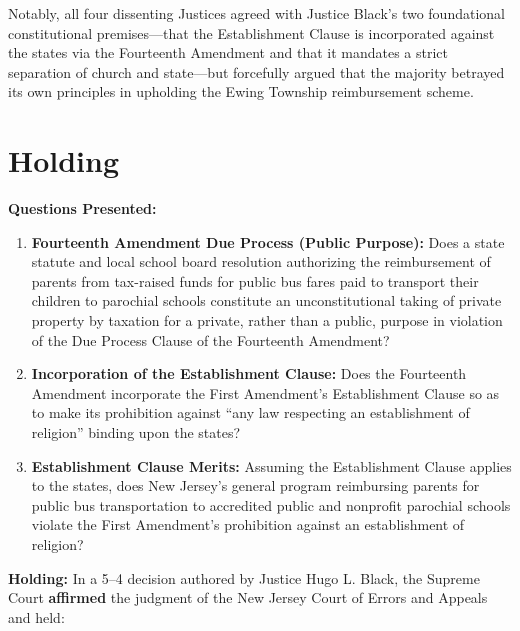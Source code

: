 \documentclass[12pt]{article}
\begin{document}
Notably, all four dissenting Justices agreed with Justice Black's two foundational constitutional premises---that the Establishment Clause is incorporated against the states via the Fourteenth Amendment and that it mandates a strict separation of church and state---but forcefully argued that the majority betrayed its own principles in upholding the Ewing Township reimbursement scheme.

\section{Holding}
\textbf{Questions Presented:}

\begin{enumerate}
  \item \textbf{Fourteenth Amendment Due Process (Public Purpose):} Does a state statute and local school board resolution authorizing the reimbursement of parents from tax-raised funds for public bus fares paid to transport their children to parochial schools constitute an unconstitutional taking of private property by taxation for a private, rather than a public, purpose in violation of the Due Process Clause of the Fourteenth Amendment?
  \item \textbf{Incorporation of the Establishment Clause:} Does the Fourteenth Amendment incorporate the First Amendment's Establishment Clause so as to make its prohibition against ``any law respecting an establishment of religion'' binding upon the states?
  \item \textbf{Establishment Clause Merits:} Assuming the Establishment Clause applies to the states, does New Jersey's general program reimbursing parents for public bus transportation to accredited public and nonprofit parochial schools violate the First Amendment's prohibition against an establishment of religion?
\end{enumerate}

\textbf{Holding:} In a 5--4 decision authored by Justice Hugo L. Black, the Supreme Court \textbf{affirmed} the judgment of the New Jersey Court of Errors and Appeals and held:
\end{document}
